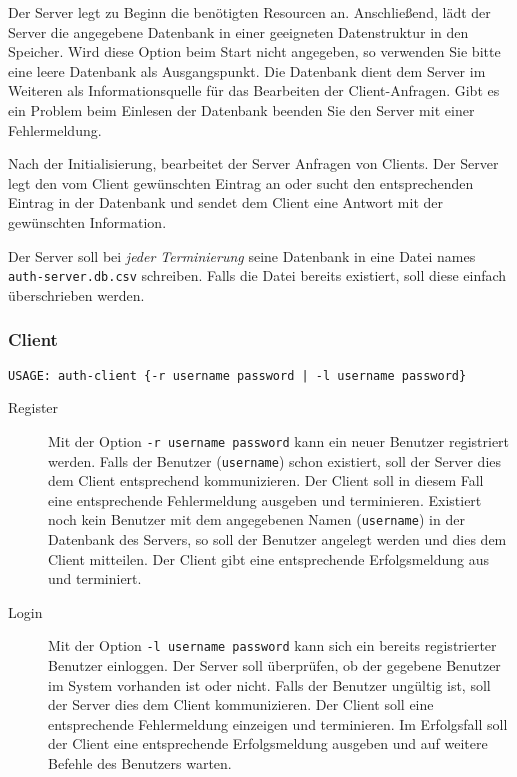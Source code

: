 Der Server legt zu Beginn die benötigten Resourcen an. Anschließend, lädt der
Server die angegebene Datenbank in einer geeigneten Datenstruktur in den
Speicher. Wird diese Option beim Start nicht angegeben, so verwenden Sie bitte
eine leere Datenbank als Ausgangspunkt. Die Datenbank dient dem Server im
Weiteren als Informationsquelle für das Bearbeiten der Client-Anfragen. Gibt es
ein Problem beim Einlesen der Datenbank beenden Sie den Server mit einer
Fehlermeldung.

Nach der Initialisierung, bearbeitet der Server Anfragen von Clients. Der
Server legt den vom Client gewünschten Eintrag an oder sucht den entsprechenden
Eintrag in der Datenbank und sendet dem Client eine Antwort mit der gewünschten
Information.

Der Server soll bei \textit{jeder Terminierung} seine Datenbank in eine Datei
names \texttt{auth-server.db.csv} schreiben. Falls die Datei bereits existiert,
soll diese einfach überschrieben werden.

\subsubsection*{Client}
\begin{verbatim}
USAGE: auth-client {-r username password | -l username password}
\end{verbatim}

\begin{description}
\item[Register] Mit der Option \texttt{-r username password} kann ein neuer
  Benutzer registriert werden. Falls der Benutzer (\texttt{username}) schon
  existiert, soll der Server dies dem Client entsprechend kommunizieren. Der
  Client soll in diesem Fall eine entsprechende Fehlermeldung ausgeben und
  terminieren. Existiert noch kein Benutzer mit dem angegebenen Namen
  (\texttt{username}) in der Datenbank des Servers, so soll der Benutzer
  angelegt werden und dies dem Client mitteilen. Der Client gibt eine
  entsprechende Erfolgsmeldung aus und terminiert.
\item[Login] Mit der Option \texttt{-l username password} kann sich ein bereits
  registrierter Benutzer einloggen. Der Server soll überprüfen, ob der gegebene
  Benutzer im System vorhanden ist oder nicht. Falls der Benutzer ungültig ist,
  soll der Server dies dem Client kommunizieren. Der Client soll eine
  entsprechende Fehlermeldung einzeigen und terminieren. Im Erfolgsfall soll
  der Client eine entsprechende Erfolgsmeldung ausgeben und auf weitere Befehle
  des Benutzers warten.
\end{description}

